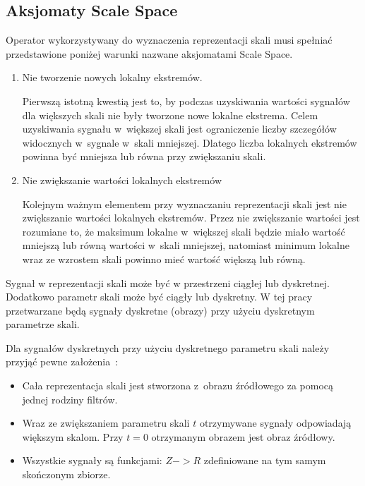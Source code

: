 \subsection{Aksjomaty Scale Space}
\label{subsec:aksjomaty}

Operator wykorzystywany do wyznaczenia reprezentacji skali musi spełniać przedstawione poniżej warunki nazwane aksjomatami Scale Space. 

\begin{enumerate}
\item Nie tworzenie nowych lokalny ekstremów.

Pierwszą istotną kwestią jest to, by podczas uzyskiwania wartości sygnałów dla większych skali nie były tworzone nowe lokalne ekstrema. Celem uzyskiwania sygnału w~większej skali jest ograniczenie liczby szczegółów widocznych w~sygnale w~skali mniejszej. Dlatego liczba lokalnych ekstremów powinna być mniejsza lub równa przy zwiększaniu skali.

\item Nie zwiększanie wartości lokalnych ekstremów

Kolejnym ważnym elementem przy wyznaczaniu reprezentacji skali jest nie zwiększanie wartości lokalnych ekstremów. Przez nie zwiększanie wartości jest rozumiane to, że maksimum lokalne w~większej skali będzie miało wartość mniejszą lub równą wartości w~skali mniejszej, natomiast minimum lokalne wraz ze wzrostem skali powinno mieć wartość większą lub równą.

\end{enumerate}

Sygnał w reprezentacji skali może być w przestrzeni ciągłej lub dyskretnej. Dodatkowo parametr skali może być ciągły lub dyskretny. W tej pracy przetwarzane będą sygnały dyskretne (obrazy) przy użyciu dyskretnym parametrze skali.

Dla sygnałów dyskretnych przy użyciu dyskretnego parametru skali należy przyjąć pewne założenia~\cite{SSFDS}:
\begin{itemize}
\item Cała reprezentacja skali jest stworzona z~obrazu źródłowego za pomocą jednej rodziny filtrów.
\item Wraz ze zwiększaniem parametru skali $ t $ otrzymywane sygnały odpowiadają większym skalom. Przy $ t = 0 $ otrzymanym obrazem jest obraz źródłowy.
\item Wszystkie sygnały są funkcjami: $ Z -> R $ zdefiniowane na tym samym skończonym zbiorze.
\end{itemize}

